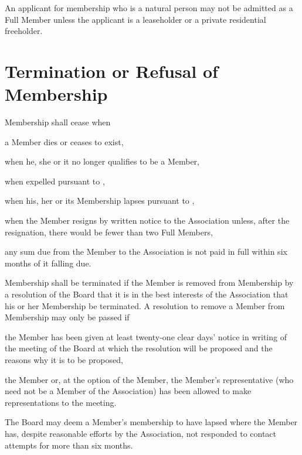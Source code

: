 \documentclass[10pt]{mk-articles-of-association}
\newcommand{\EC}[0]{Board}
\newcommand{\Exec}[0]{\EC{} }
\begin{document}
\begin{constenum}
  \item An applicant for membership who is a natural person may not be
    admitted as a Full Member unless the applicant is a leaseholder or
    a private residential freeholder.

\end{constenum}



\section{Termination or Refusal of Membership}

\begin{constenum}

  \item
    Membership shall cease when
    \begin{constenum}
      \item a Member dies or ceases to exist,
      \item when he, she or it no longer qualifies to be a Member,
      \item when expelled pursuant to ,
      \item when his, her or its Membership lapses pursuant to
        ,
      \item when the Member resigns by written notice to the
        Association unless, after the resignation, there would be
        fewer than two Full Members, \ITor{}
      \item any sum due from the Member to the Association is not paid in full
        within six months of it falling due.
    \end{constenum}

\item Membership shall be terminated if
\label{expulsion}
  the Member is removed from Membership by a resolution of the
  \Exec that it is in the best interests of the Association that his or
  her Membership be terminated. A resolution to remove a Member from
  Membership may only be passed if

\begin{constenum}

\item the Member has been given at least twenty-one clear days' notice in
  writing of the meeting of the \Exec at which the resolution will
  be proposed and the reasons why it is to be proposed,

\item the Member or, at the option of the Member, the Member's
  representative (who need not be a Member of the Association) has been
  allowed to make representations to the meeting.

\end{constenum}

\item The \Exec may deem a Member's membership to have lapsed where
  the Member has, despite reasonable efforts by the Association, not
  responded to contact attempts for more than six months.
  \label{lapse}

\end{constenum}

\end{document}
